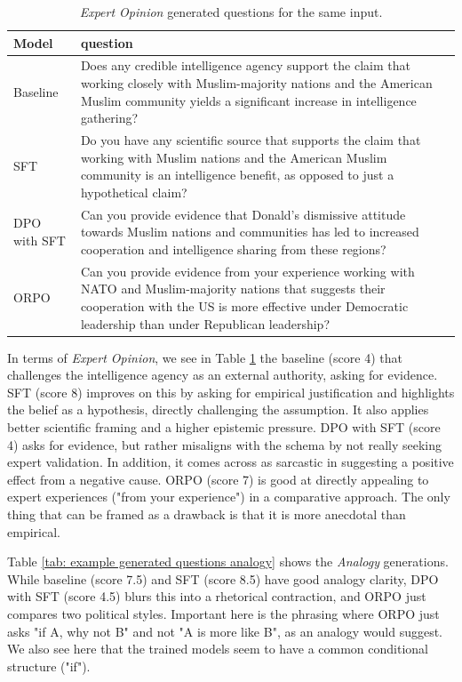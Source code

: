 \documentclass[11pt]{article}
\begin{document}
\begin{table} [H]
    \centering
    \begin{tabular}{p{1.4cm}p{5.5cm}}
    \hline
    \textbf{Model} & \textbf{question}\\
    \hline
     Baseline & Does any credible intelligence agency support the claim that working closely with Muslim-majority nations and the American Muslim community yields a significant increase in intelligence gathering? \\
     SFT & Do you have any scientific source that supports the claim that working with Muslim nations and the American Muslim community is an intelligence benefit, as opposed to just a hypothetical claim? \\
     DPO with SFT & Can you provide evidence that Donald's dismissive attitude towards Muslim nations and communities has led to increased cooperation and intelligence sharing from these regions? \\
     ORPO & Can you provide evidence from your experience working with NATO and Muslim-majority nations that suggests their cooperation with the US is more effective under Democratic leadership than under Republican leadership?\\
    \end{tabular}
    \caption{\textit{Expert Opinion} generated questions for the same input.}
    \label{tab: example generated questions expert}
\end{table}

In terms of \textit{Expert Opinion}, we see in Table \ref{tab: example generated questions expert} the baseline (score 4) that challenges the intelligence agency as an external authority, asking for evidence. SFT (score 8) improves on this by asking for empirical justification and highlights the belief as a hypothesis, directly challenging the assumption. It also applies better scientific framing and a higher epistemic pressure. DPO with SFT (score 4) asks for evidence, but rather misaligns with the schema by not really seeking expert validation. In addition, it comes across as sarcastic in suggesting a positive effect from a negative cause. ORPO (score 7) is good at directly appealing to expert experiences ("from your experience") in a comparative approach. The only thing that can be framed as a drawback is that it is more anecdotal than empirical.

Table \ref{tab: example generated questions analogy} shows the \textit{Analogy} generations. While baseline (score 7.5) and SFT (score 8.5) have good analogy clarity, DPO with SFT (score 4.5) blurs this into a rhetorical contraction, and ORPO just compares two political styles. Important here is the phrasing where ORPO just asks "if A, why not B" and not "A is more like B", as an analogy would suggest. We also see here that the trained models seem to have a common conditional structure ("if"). 
\end{document}
